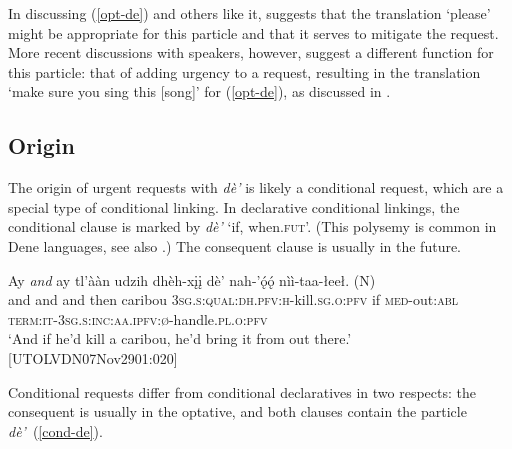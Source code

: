 \documentclass[output=paper,colorlinks,citecolor=brown
]{langscibook}
\begin{document}
\noindent In discussing (\ref{opt-de}) and others like it, \citet[269]{LovickO2016} suggests that the translation `please' might be appropriate for this particle and that it serves to mitigate the request. More recent discussions with speakers, however, suggest a different function for this particle: that of adding urgency to a request, resulting in the translation `make sure you sing this [song]' for (\ref{opt-de}), as discussed in .

\subsection{Origin}
\label{subsection:urgent-origin}

The origin of urgent requests with \textit{dè'} is likely a conditional request, which are a special type of conditional linking. In declarative conditional linkings, the conditional clause is marked by \textit{dè'} `if, when.\textsc{fut}'. (This polysemy is common in Dene languages, see also \citealt{AnismanA2019}.) The consequent clause is usually in the future.

\ea \label{conditional}
\gll Ay \textit{and} ay tl'ààn udzih dhèh-xįį dè' nah-'ǫ́ǫ́ nìì-taa-łeeł. \textnormal{(N)} \\
and and and then caribou \textsc{3sg.s:qual:dh.pfv:h}-kill.\textsc{sg.o:pfv} if \textsc{med}-out:\textsc{abl} \textsc{term:it-3sg.s:inc:aa.ipfv:ø}-handle.\textsc{pl.o:pfv} \\
\glt `And if he'd kill a caribou, he'd bring it from out there.' \\ \hfill [UTOLVDN07Nov2901:020]
\z

Conditional requests differ from conditional declaratives in two respects: the consequent is usually in the optative, and both clauses contain the particle \textit{dè'}~(\ref{cond-de}).
\end{document}
